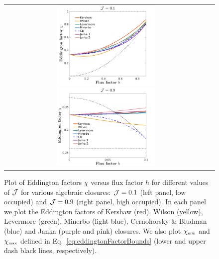 \begin{figure}[h]
  \centering
  \begin{tabular}{cc}
    \includegraphics[width=0.5\textwidth]{figures/Closures0_10}
    \includegraphics[width=0.5\textwidth]{figures/Closures0_90}
  \end{tabular}
   \caption{Plot of Eddington factors $\chi$ versus flux factor $h$ for different values of $\mathcal{J}$ for various algebraic closures: $\mathcal{J}=0.1$ (left panel, low occupied) and $\mathcal{J}=0.9$ (right panel, high occupied).  In each panel we plot the Eddington factors of Kershaw (red), Wilson (yellow), Levermore (green), Minerbo (light blue), Cernohorsky \& Bludman (blue) and Janka (purple and pink) closures.  We also plot $\chi_{\mbox{\tiny min}}$ and $\chi_{\mbox{\tiny max}}$ defined in Eq.~\eqref{eq:eddingtonFactorBounds} (lower and upper dash black lines, respectively).}
  \label{fig:EddingtonFactorsWithDifferentClosure}
\end{figure}

